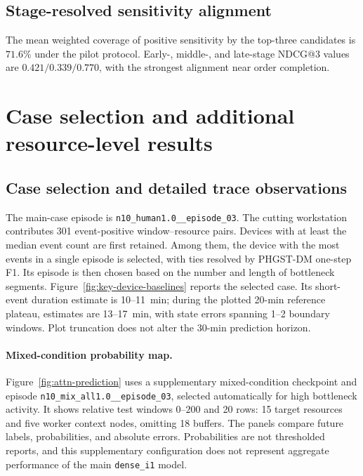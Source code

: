 \documentclass[a4paper,fleqn]{cas-dc}
\begin{document}
\subsection{Stage-resolved sensitivity alignment}

The mean weighted coverage of positive sensitivity by the top-three candidates is $71.6\%$ under the pilot protocol. Early-, middle-, and late-stage NDCG@3 values are $0.421/0.339/0.770$, with the strongest alignment near order completion. 

\section{Case selection and additional resource-level results}\label{app:case-details}

\subsection{Case selection and detailed trace observations}

The main-case episode is \texttt{n10\_human1.0\_\_episode\_03}. The cutting workstation contributes 301 event-positive window--resource pairs. Devices with at least the median event count are first retained. Among them, the device with the most events in a single episode is selected, with ties resolved by PHGST-DM one-step F1. Its episode is then chosen based on the number and length of bottleneck segments. Figure~\ref{fig:key-device-baselines} reports the selected case. Its short-event duration estimate is 10--11~min; during the plotted 20-min reference plateau, estimates are 13--17~min, with state errors spanning 1--2 boundary windows. Plot truncation does not alter the 30-min prediction horizon.











\paragraph*{Mixed-condition probability map.}
Figure~\ref{fig:attn-prediction} uses a supplementary mixed-condition checkpoint and episode \texttt{n10\_mix\_all1.0\_\_episode\_03}, selected automatically for high bottleneck activity. It shows relative test windows $0$--$200$ and 20 rows: 15 target resources and five worker context nodes, omitting 18 buffers. The panels compare future labels, probabilities, and absolute errors. Probabilities are not thresholded reports, and this supplementary configuration does not represent aggregate performance of the main \texttt{dense\_i1} model.
\end{document}
